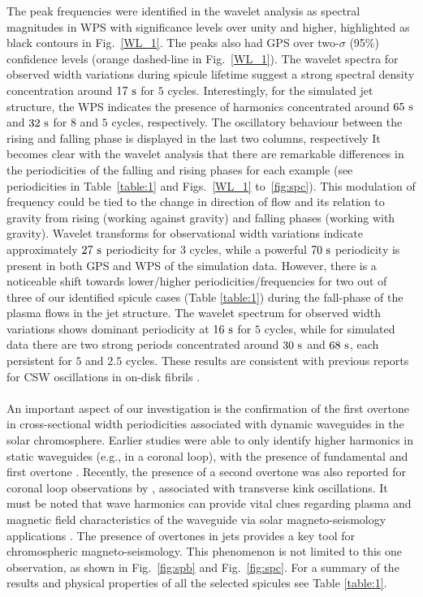 \documentclass[12pt]{ociamthesis}
\newcommand{\np}{\\ \\}
\begin{document}
The peak frequencies were identified in the wavelet analysis as spectral magnitudes in WPS with significance levels over unity and higher, highlighted as black contours in Fig.~\ref{WL_1}. The peaks also had GPS over two-$\sigma$ (95\%) confidence levels (orange dashed-line in Fig.~\ref{WL_1}). The wavelet spectra for observed width variations during spicule lifetime suggest a strong spectral density concentration around $17~\rm{s}$ for $5$ cycles. Interestingly, for the simulated jet structure, the WPS indicates the presence of harmonics concentrated around $65~\rm{s}$ and $32~\rm{s}$ for $8$ and $5$ cycles, respectively. The oscillatory behaviour between the rising and falling phase is displayed in the last two columns, respectively It becomes clear with the wavelet analysis that there are remarkable differences in the periodicities of the falling and rising phases for each example (see periodicities in Table~\ref{table:1} and Figs.~\ref{WL_1} to~\ref{fig:spc}). This modulation of frequency could be tied to the change in direction of flow and its relation to gravity from rising (working against gravity) and falling phases (working with gravity). Wavelet transforms for observational width variations indicate approximately $27~\rm{s}$ periodicity for 3 cycles, while a powerful $70~\rm{s}$ periodicity is present in both GPS and WPS of the simulation data. However, there is a noticeable shift towards lower/higher periodicities/frequencies for two out of three of our identified spicule cases (Table \ref{table:1}) during the fall-phase of the plasma flows in the jet structure. The wavelet spectrum for observed width variations shows dominant periodicity at $16~\rm{s}$ for $5$ cycles, while for simulated data there are two strong periods concentrated around $30~\rm{s}$ and $68~\rm{s}$, each persistent for $5$ and $2.5$ cycles. These results are consistent with previous reports for CSW oscillations in on-disk fibrils \citep{Gafeira2017}. \np
%
An important aspect of our investigation is the confirmation of the first overtone in cross-sectional width periodicities associated with dynamic waveguides in the solar chromosphere.  Earlier studies were able to only identify higher harmonics in static waveguides (e.g., in a coronal loop), with the presence of fundamental and first overtone \citep{verwichte2004, guo2015}. Recently, the presence of a second overtone was also reported for coronal loop observations by \citet{duckenfield2019}, associated with transverse kink oscillations. It must be noted that wave harmonics can provide vital clues regarding plasma and magnetic field characteristics of the waveguide via solar magneto-seismology applications \citep{andries2005,andries2009}. The presence of overtones in jets provides a key tool for chromospheric magneto-seismology. This phenomenon is not limited to this one observation, as shown in Fig.~\ref{fig:spb} and Fig.~\ref{fig:spc}. For a summary of the results and physical properties of all the selected spicules see Table \ref{table:1}. \np 
\end{document}
